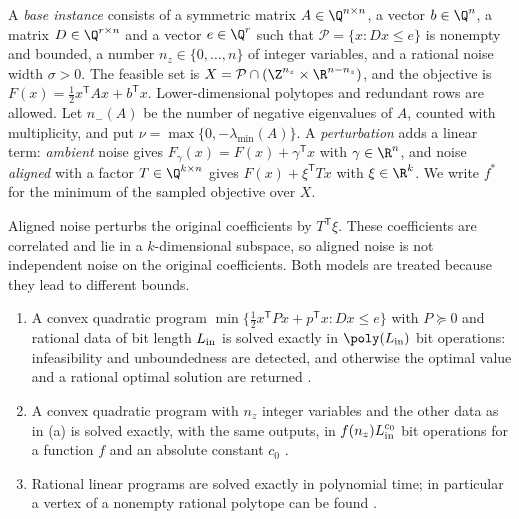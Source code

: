 \begin{definition}\label{def:qp:instance}
A \emph{base instance} consists of a symmetric matrix $A\in\Q^{n\times n}$,
a vector $b\in\Q^n$, a matrix $D\in\Q^{r\times n}$ and a vector $e\in\Q^r$
such that $\mathcal P=\{x:Dx\le e\}$ is nonempty and bounded, a number
$n_z\in\{0,\dots,n\}$ of integer variables, and a rational noise width
$\sigma>0$. The feasible set is
$X=\mathcal P\cap(\Z^{n_z}\times\R^{n-n_z})$, and the objective is
$F(x)=\frac12x^{\mathsf T} Ax+b^{\mathsf T} x$. Lower-dimensional polytopes and redundant
rows are allowed. Let $n_-(A)$ be the number of negative eigenvalues of $A$,
counted with multiplicity, and put $\nu=\max\{0,-\lambda_{\min}(A)\}$. A
\emph{perturbation} adds a linear term: \emph{ambient} noise gives
$F_\gamma(x)=F(x)+\gamma^{\mathsf T} x$ with $\gamma\in\R^n$, and noise
\emph{aligned} with a factor $T\in\Q^{k\times n}$ gives
$F(x)+\xi^{\mathsf T} Tx$ with $\xi\in\R^k$. We write $f^*$ for the minimum of the
sampled objective over $X$.
\end{definition}

Aligned noise perturbs the original coefficients by $T^{\mathsf T}\xi$. These
coefficients are correlated and lie in a $k$-dimensional subspace, so aligned
noise is not independent noise on the original coefficients. Both models are
treated because they lead to different bounds.

\begin{proposition}\label{prop:qp:primitives}
\begin{enumerate}[label=(\alph*)]
\item A convex quadratic program $\min\{\frac12x^{\mathsf T} Px+p^{\mathsf T} x:Dx\le e\}$
 with $P\succeq0$ and rational data of bit length $L_{\rm in}$ is solved
 exactly in $\poly(L_{\rm in})$ bit operations: infeasibility and
 unboundedness are detected, and otherwise the optimal value and a rational
 optimal solution are returned
 \cite{kozlov1980-the-polynomial-solvability-of-convex}.
\item A convex quadratic program with $n_z$ integer variables and the other
 data as in (a) is solved exactly, with the same outputs, in
 $f(n_z)L_{\rm in}^{c_0}$ bit operations for a function $f$ and an absolute
 constant $c_0$ \cite[Theorem~3]{pia2025-convex-quadratic-sets-and-the}.
\item Rational linear programs are solved exactly in polynomial time; in
 particular a vertex of a nonempty rational polytope can be found
 \cite{grotschel1988-geometric-algorithms-and-combinatorial-optimization}.
\end{enumerate}
\end{proposition}

